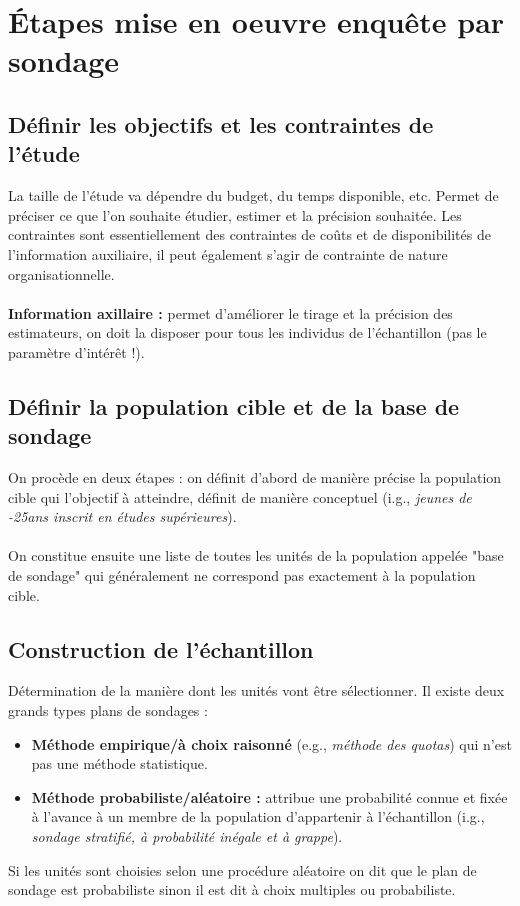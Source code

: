 \documentclass{article}
\begin{document}
\section{Étapes mise en oeuvre enquête par sondage}
\subsection{Définir les objectifs et les contraintes de l'étude} La taille de l'étude va dépendre du budget, du temps disponible, etc. Permet de préciser ce que l'on souhaite étudier, estimer et la précision souhaitée. Les contraintes sont essentiellement des contraintes de coûts et de disponibilités de l'information auxiliaire, il peut également s'agir de contrainte de nature organisationnelle. \\ \\
\textbf{Information axillaire :} permet d'améliorer le tirage et la précision des estimateurs, on doit la disposer pour tous les individus de l'échantillon (pas le paramètre d'intérêt !).
\subsection{Définir la population cible et de la base de sondage} On procède en deux étapes : on définit d'abord de manière précise la population cible qui l'objectif à atteindre, définit de manière conceptuel (i.g., \textit{jeunes de -25ans inscrit en études supérieures}). \\ \\
On constitue ensuite une liste de toutes les unités de la population appelée "base de sondage" qui généralement ne correspond pas exactement à la population cible.
\subsection{Construction de l'échantillon} Détermination de la manière dont les unités vont être sélectionner. Il existe deux grands types plans de sondages :
\begin{itemize}
    \item \textbf{Méthode empirique/à choix raisonné} (e.g., \textit{méthode des quotas}) qui n'est pas une méthode statistique.
    \item \textbf{Méthode probabiliste/aléatoire :} attribue une probabilité connue et fixée à l'avance à un membre de la population d'appartenir à l'échantillon (i.g., \textit{sondage stratifié, à probabilité inégale et à grappe}).
\end{itemize}
Si les unités sont choisies selon une procédure aléatoire on dit que le plan de sondage est probabiliste sinon il est dit à choix multiples ou probabiliste. \\ \\
\end{document}
